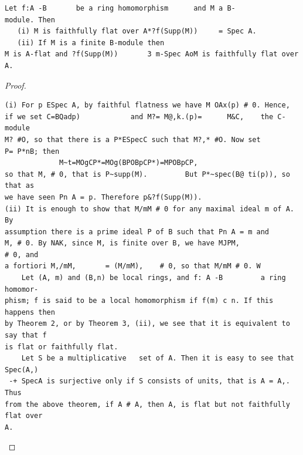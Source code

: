 \begin{theorem}\label{mcrt-auto-theorem-7-3}\uses{}
\begin{verbatim}
Let f:A -B       be a ring homomorphism      and M a B-
module. Then
   (i) M is faithfully flat over A*?f(Supp(M))     = Spec A.
   (ii) If M is a finite B-module then
M is A-flat and ?f(Supp(M))       3 m-Spec AoM is faithfully flat over A.
\end{verbatim}
\end{theorem}
\begin{proof}
\begin{verbatim}
(i) For p ESpec A, by faithful flatness we have M OAx(p) # 0. Hence,
if we set C=BQadp)            and M?= M@,k.(p)=      M&C,    the C-module
M? #O, so that there is a P*ESpecC such that M?,* #O. Now set
P= P*nB; then
             M~t=MOgCP*=MOg(BPOBpCP*)=MPOBpCP,
so that M, # 0, that is P~supp(M).         But P*~spec(B@ ti(p)), so that as
we have seen Pn A = p. Therefore p&?f(Supp(M)).
(ii) It is enough to show that M/mM # 0 for any maximal ideal m of A. By
assumption there is a prime ideal P of B such that Pn A = m and
M, # 0. By NAK, since M, is finite over B, we have MJPM,              # 0, and
a fortiori M,/mM,       = (M/mM),    # 0, so that M/mM # 0. W
    Let (A, m) and (B,n) be local rings, and f: A -B         a ring homomor-
phism; f is said to be a local homomorphism if f(m) c n. If this happens then
by Theorem 2, or by Theorem 3, (ii), we see that it is equivalent to say that f
is flat or faithfully flat.
    Let S be a multiplicative   set of A. Then it is easy to see that Spec(A,)
 -+ SpecA is surjective only if S consists of units, that is A = A,. Thus
from the above theorem, if A # A, then A, is flat but not faithfully flat over
A.
\end{verbatim}
\end{proof}



